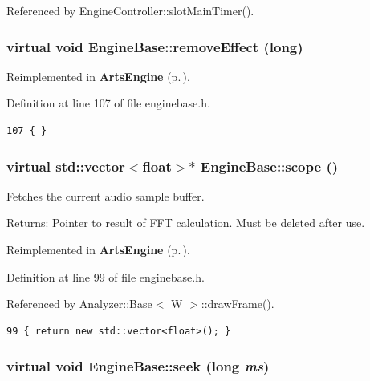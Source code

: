 Referenced by Engine\-Controller::slot\-Main\-Timer().
\subsubsection{\setlength{\rightskip}{0pt plus 5cm}virtual void Engine\-Base::remove\-Effect (long)\hspace{0.3cm}{\tt  [inline, virtual]}}\label{classEngineBase_EngineBasea21}




Reimplemented in {\bf Arts\-Engine} {\rm (p.\,\pageref{classArtsEngine_ArtsEnginea15})}.

Definition at line 107 of file enginebase.h.



\footnotesize\begin{verbatim}107 { }
\end{verbatim}\normalsize 
{}
\subsubsection{\setlength{\rightskip}{0pt plus 5cm}virtual std::vector$<$float$>$$\ast$ Engine\-Base::scope ()\hspace{0.3cm}{\tt  [inline, virtual]}}\label{classEngineBase_EngineBasea14}


Fetches the current audio sample buffer. \begin{Desc}
\item[Returns:]Pointer to result of FFT calculation. Must be deleted after use. \end{Desc}


Reimplemented in {\bf Arts\-Engine} {\rm (p.\,\pageref{classArtsEngine_ArtsEnginea9})}.

Definition at line 99 of file enginebase.h.

Referenced by Analyzer::Base$<$ W $>$::draw\-Frame().



\footnotesize\begin{verbatim}99 { return new std::vector<float>(); }
\end{verbatim}\normalsize 
{}
\subsubsection{\setlength{\rightskip}{0pt plus 5cm}virtual void Engine\-Base::seek (long {\em ms})\hspace{0.3cm}{\tt  [pure virtual, slot]}}\label{classEngineBase_EngineBasei5}




